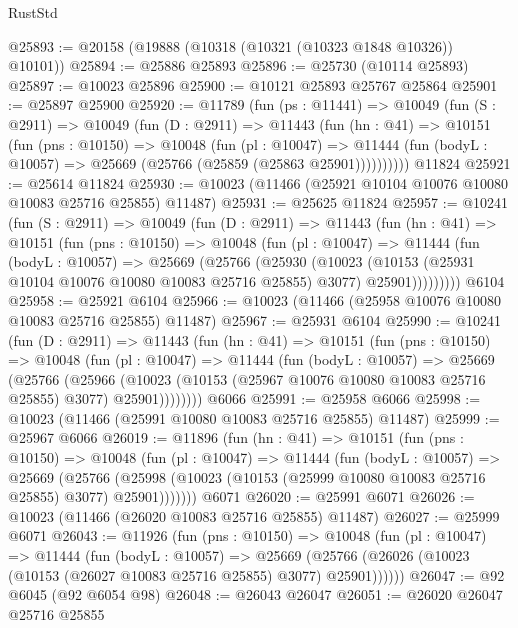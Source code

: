 \begin{lexlean}{RustStd}
\begin{coremodule}
@25893 := @20158 (@19888 (@10318 (@10321 (@10323 @1848 @10326)) @10101))
@25894 := @25886 @25893
@25896 := @25730 (@10114 @25893)
@25897 := @10023 @25896
@25900 := @10121 @25893 @25767 @25864
@25901 := @25897 @25900
@25920 := @11789
    (fun (ps : @11441) =>
    @10049
      (fun (S : @2911) =>
      @10049
        (fun (D : @2911) =>
        @11443
          (fun (hn : @41) =>
          @10151
            (fun (pns : @10150) =>
            @10048
              (fun (pl : @10047) =>
              @11444 (fun (bodyL : @10057) => @25669 (@25766 (@25859 (@25863 @25901))))))))))
    @11824
@25921 := @25614 @11824
@25930 := @10023 (@11466 (@25921 @10104 @10076 @10080 @10083 @25716 @25855) @11487)
@25931 := @25625 @11824
@25957 := @10241
    (fun (S : @2911) =>
    @10049
      (fun (D : @2911) =>
      @11443
        (fun (hn : @41) =>
        @10151
          (fun (pns : @10150) =>
          @10048
            (fun (pl : @10047) =>
            @11444
              (fun (bodyL : @10057) =>
              @25669
                (@25766
                  (@25930
                    (@10023
                      (@10153 (@25931 @10104 @10076 @10080 @10083 @25716 @25855) @3077)
                      @25901)))))))))
    @6104
@25958 := @25921 @6104
@25966 := @10023 (@11466 (@25958 @10076 @10080 @10083 @25716 @25855) @11487)
@25967 := @25931 @6104
@25990 := @10241
    (fun (D : @2911) =>
    @11443
      (fun (hn : @41) =>
      @10151
        (fun (pns : @10150) =>
        @10048
          (fun (pl : @10047) =>
          @11444
            (fun (bodyL : @10057) =>
            @25669
              (@25766
                (@25966
                  (@10023 (@10153 (@25967 @10076 @10080 @10083 @25716 @25855) @3077) @25901))))))))
    @6066
@25991 := @25958 @6066
@25998 := @10023 (@11466 (@25991 @10080 @10083 @25716 @25855) @11487)
@25999 := @25967 @6066
@26019 := @11896
    (fun (hn : @41) =>
    @10151
      (fun (pns : @10150) =>
      @10048
        (fun (pl : @10047) =>
        @11444
          (fun (bodyL : @10057) =>
          @25669
            (@25766
              (@25998 (@10023 (@10153 (@25999 @10080 @10083 @25716 @25855) @3077) @25901)))))))
    @6071
@26020 := @25991 @6071
@26026 := @10023 (@11466 (@26020 @10083 @25716 @25855) @11487)
@26027 := @25999 @6071
@26043 := @11926
    (fun (pns : @10150) =>
    @10048
      (fun (pl : @10047) =>
      @11444
        (fun (bodyL : @10057) =>
        @25669 (@25766 (@26026 (@10023 (@10153 (@26027 @10083 @25716 @25855) @3077) @25901))))))
@26047 := @92 @6045 (@92 @6054 @98)
@26048 := @26043 @26047
@26051 := @26020 @26047 @25716 @25855

\end{coremodule}
\end{lexlean}
